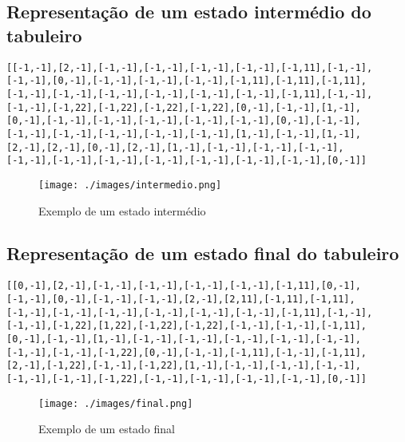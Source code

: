 \documentclass[a4paper]{article}
\begin{document}
\vspace{15 mm}

\subsection{Representação de um estado intermédio do tabuleiro}

\begin{small}
\begin{lstlisting}
[[-1,-1],[2,-1],[-1,-1],[-1,-1],[-1,-1],[-1,-1],[-1,11],[-1,-1],
[-1,-1],[0,-1],[-1,-1],[-1,-1],[-1,-1],[-1,11],[-1,11],[-1,11],
[-1,-1],[-1,-1],[-1,-1],[-1,-1],[-1,-1],[-1,-1],[-1,11],[-1,-1],
[-1,-1],[-1,22],[-1,22],[-1,22],[-1,22],[0,-1],[-1,-1],[1,-1],
[0,-1],[-1,-1],[-1,-1],[-1,-1],[-1,-1],[-1,-1],[0,-1],[-1,-1],
[-1,-1],[-1,-1],[-1,-1],[-1,-1],[-1,-1],[1,-1],[-1,-1],[1,-1],
[2,-1],[2,-1],[0,-1],[2,-1],[1,-1],[-1,-1],[-1,-1],[-1,-1],
[-1,-1],[-1,-1],[-1,-1],[-1,-1],[-1,-1],[-1,-1],[-1,-1],[0,-1]]
\end{lstlisting}
\end{small}

\begin{figure}[h!]
	\begin{center}
		\texttt{[image: ./images/intermedio.png]}
		\caption{Exemplo de um estado intermédio}
		\label{fig:6}
	\end{center}
\end{figure}

\subsection{Representação de um estado final do tabuleiro}

\begin{small}
\begin{lstlisting}
[[0,-1],[2,-1],[-1,-1],[-1,-1],[-1,-1],[-1,-1],[-1,11],[0,-1],
[-1,-1],[0,-1],[-1,-1],[-1,-1],[2,-1],[2,11],[-1,11],[-1,11],
[-1,-1],[-1,-1],[-1,-1],[-1,-1],[-1,-1],[-1,-1],[-1,11],[-1,-1],
[-1,-1],[-1,22],[1,22],[-1,22],[-1,22],[-1,-1],[-1,-1],[-1,11],
[0,-1],[-1,-1],[1,-1],[-1,-1],[-1,-1],[-1,-1],[-1,-1],[-1,-1],
[-1,-1],[-1,-1],[-1,22],[0,-1],[-1,-1],[-1,11],[-1,-1],[-1,11],
[2,-1],[-1,22],[-1,-1],[-1,22],[1,-1],[-1,-1],[-1,-1],[-1,-1],
[-1,-1],[-1,-1],[-1,22],[-1,-1],[-1,-1],[-1,-1],[-1,-1],[0,-1]]
\end{lstlisting}
\end{small}

\begin{figure}[h!]
	\begin{center}
		\texttt{[image: ./images/final.png]}
		\caption{Exemplo de um estado final}
		\label{fig:7}
	\end{center}
\end{figure}
\end{document}
